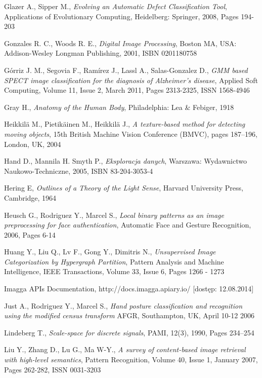 \begin{thebibliography}{100}
 Glazer A., Sipper M., \emph{Evolving an Automatic Defect Classification Tool}, Applications of Evolutionary Computing, Heidelberg: Springer, 2008, Pages 194-203

 Gonzales R. C., Woods R. E., \emph{Digital Image Processing}, Boston MA, USA: Addison-Wesley Longman Publishing, 2001, ISBN 0201180758

 Górriz J. M., Segovia F., Ramírez J., Lassl A., Salas-Gonzalez D., \emph{GMM based SPECT image classification for the diagnosis of Alzheimer’s disease}, Applied Soft Computing, Volume 11, Issue 2, March 2011, Pages 2313-2325, ISSN 1568-4946

 Gray H., \emph{Anatomy of the Human Body}, Philadelphia: Lea \& Febiger, 1918 

 Heikkilä M., Pietikäinen M., Heikkilä J., \emph{A texture-based method for detecting moving objects}, 15th British Machine Vision Conference (BMVC), pages 187–196, London, UK, 2004

 Hand D., Mannila H. Smyth P., \emph{Eksploracja danych}, Warszawa: Wydawnictwo Naukowo-Techniczne, 2005, ISBN 83-204-3053-4

 Hering E, \emph{Outlines of a Theory of the Light Sense}, Harvard University Press, Cambridge, 1964

 Heusch G., Rodriguez Y., Marcel S., \emph{Local binary patterns as an image preprocessing for face authentication}, Automatic Face and Gesture Recognition, 2006, Pages 6-14

 Huang Y., Liu Q., Lv F., Gong Y., Dimitris N., \emph{Unsupervised Image Categorization by Hypergraph Partition}, Pattern Analysis and Machine Intelligence, IEEE Transactions, Volume 33, Issue 6, Pages 1266 - 1273

 Imagga APIs Documentation, http://docs.imagga.apiary.io/ [dostęp: 12.08.2014]

 Just A., Rodriguez Y., Marcel S., \emph{Hand posture classification and recognition using the modified census transform} AFGR, Southampton, UK, April 10-12 2006

 Lindeberg T., \emph{Scale-space for discrete signals}, PAMI, 12(3), 1990, Pages 234–254

 Liu Y., Zhang D., Lu G., Ma W-Y., \emph{A survey of content-based image retrieval with high-level semantics}, Pattern Recognition, Volume 40, Issue 1, January 2007, Pages 262-282, ISSN 0031-3203


\end{thebibliography}
